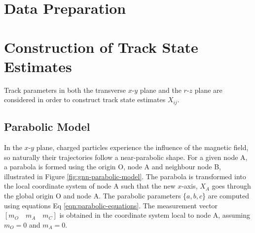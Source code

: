 \section{Data Preparation}






\section{Construction of Track State Estimates}
\label{constructing-track-states}

Track parameters in both the transverse $x$-$y$ plane and the $r$-$z$ plane are considered in order to construct track state estimates $X_{ij}$.


\subsection{Parabolic Model}
\label{parabolic-state}

In the $x$-$y$ plane, charged particles experience the influence of the magnetic field, so naturally their trajectories follow a near-parabolic shape. For a given node A, a parabola is formed using the origin O, node A and neighbour node B, illustrated in Figure \ref{fig:gnn-parabolic-model}. The parabola is transformed into the local coordinate system of node A such that the new $x$-axis, $X_A$ goes through the global origin O and node A. The parabolic parameters \{$a, b, c$\} are computed using equations Eq \eqref{eqn:parabolic-equations}. The measurement vector $[m_O \quad m_A \quad m_C]$ is obtained in the coordinate system local to node A, assuming $m_O = 0$ and $m_A = 0$.

